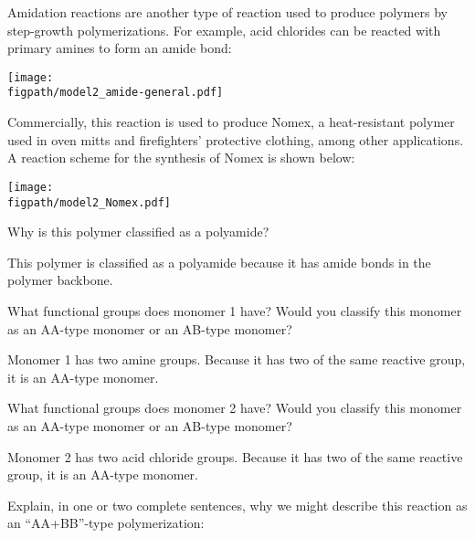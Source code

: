 \begin{activity}
\begin{ctqs}
\begin{enumerate}
		\end{enumerate}
		
\end{ctqs}
	

\begin{model}

Amidation reactions are another type of reaction used to produce polymers by step-growth polymerizations.
For example, acid chlorides can be reacted with primary amines to form an amide bond:
	
	\centerline{\texttt{[image: \\figpath/model2\_amide-general.pdf]}}

Commercially, this reaction is used to produce Nomex, a heat-resistant polymer used in oven mitts and firefighters' protective clothing, among other applications.
A reaction scheme for the synthesis of Nomex is shown below:
	
	\centerline{\texttt{[image: \\figpath/model2\_Nomex.pdf]}}

\end{model}

\begin{ctqs}
		\question Why is this polymer classified as a polyamide?
			
				\begin{solution}[2in]
					This polymer is classified as a polyamide because it has amide bonds in the polymer backbone.
				\end{solution}
		
		\question What functional groups does monomer 1 have?   Would you classify this monomer as an AA-type monomer or an AB-type monomer?
			
				\begin{solution}[0.75in]
					Monomer 1 has two amine groups.  Because it has two of the same reactive group, it is an AA-type monomer.
				\end{solution}
		
		\question What functional groups does monomer 2 have?   Would you classify this monomer as an AA-type monomer or an AB-type monomer?
			
				\begin{solution}[0.75in]
					Monomer 2 has two acid chloride groups.  Because it has two of the same reactive group, it is an AA-type monomer.
				\end{solution}
		
		\question Explain, in one or two complete sentences, why we might describe this reaction as an ``AA+BB''-type polymerization:
			

\end{ctqs}
\end{activity}
